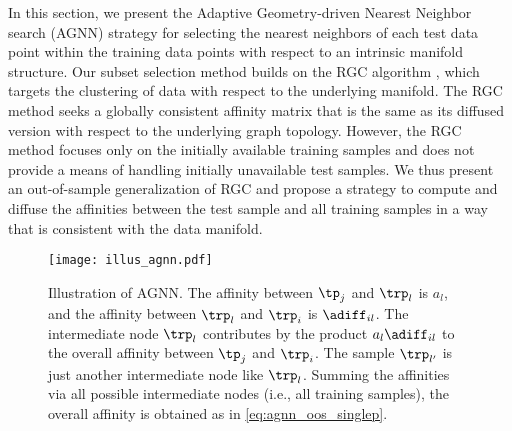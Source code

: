 \documentclass[journal]{IEEEtran}
\begin{document}

In this section, we present the Adaptive Geometry-driven Nearest Neighbor search (AGNN) strategy for selecting the nearest neighbors of each test data point within the training data points with respect to an intrinsic manifold structure. Our subset selection method builds on the RGC algorithm \cite{Donoser13replicator}, which targets the clustering of data with respect to the underlying manifold. The RGC method seeks a globally consistent affinity matrix that is the same as its diffused version with respect to the underlying graph topology. However, the RGC method focuses only on the initially available training samples and does not provide a means of handling initially unavailable test samples. We thus present an out-of-sample generalization of RGC and propose a strategy to compute and diffuse the affinities between the test sample and all training samples in a way that is consistent with the data manifold.



\begin{figure}[!t]
	\centering
	\texttt{[image: illus\_agnn.pdf]}
	\caption{Illustration of AGNN. The affinity between $\tp_j$ and $\trp_l$ is $a_l$, and the affinity between $\trp_l$ and $\trp_i$ is $\adiff_{il}$. The intermediate node $\trp_l$ contributes by the product $a_l \adiff_{il}$ to the overall affinity between $\tp_j$ and $\trp_i$. The sample $\trp_{l'}$ is just another intermediate node like $\trp_l$. Summing the affinities via all possible intermediate nodes (i.e., all training samples), the overall affinity is obtained as in \eqref{eq:agnn_oos_singlep}.}
	\label{fig:illus_agnn}
\end{figure}
\end{document}
